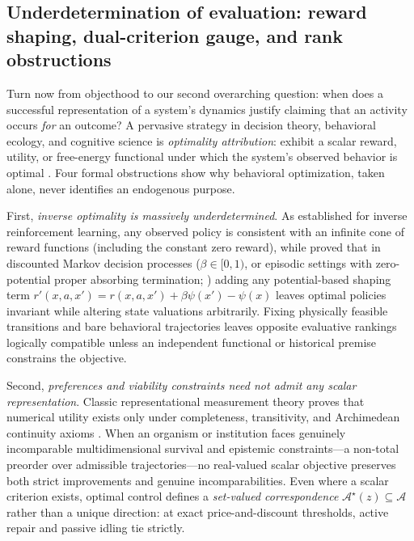 \documentclass[11pt,a4paper]{article}
\begin{document}
\subsection{Underdetermination of evaluation: reward shaping,
dual-criterion gauge, and rank
obstructions}\label{underdetermination-of-evaluation-reward-shaping-dual-criterion-gauge-and-rank-obstructions}

Turn now from objecthood to our second overarching question: when does a
successful representation of a system's dynamics justify claiming that
an activity occurs \emph{for} an outcome? A pervasive strategy in
decision theory, behavioral ecology, and cognitive science is
\emph{optimality attribution}: exhibit a scalar reward, utility, or
free-energy functional under which the system's observed behavior is
optimal \citep{puterman1994, friston2010}. Four formal obstructions show
why behavioral optimization, taken alone, never identifies an endogenous
purpose.

First, \emph{inverse optimality is massively underdetermined}. As
\citet[3.1]{ngRussell2000} established for inverse reinforcement
learning, any observed policy is consistent with an infinite cone of
reward functions (including the constant zero reward), while
\citet{ngHaradaRussell1999} proved that in discounted Markov decision
processes (\(\beta \in [0, 1)\), or episodic settings with
zero-potential proper absorbing termination; \citet{blackwell1965})
adding any potential-based shaping term
\(r'(x,a,x') = r(x,a,x') + \beta \psi(x') - \psi(x)\) leaves optimal
policies invariant while altering state valuations arbitrarily. Fixing
physically feasible transitions and bare behavioral trajectories leaves
opposite evaluative rankings logically compatible unless an independent
functional or historical premise constrains the objective.

Second, \emph{preferences and viability constraints need not admit any
scalar representation}. Classic representational measurement theory
proves that numerical utility exists only under completeness,
transitivity, and Archimedean continuity axioms \citep{krantz1971}. When
an organism or institution faces genuinely incomparable multidimensional
survival and epistemic constraints---a non-total preorder over
admissible trajectories---no real-valued scalar objective preserves both
strict improvements and genuine incomparabilities. Even where a scalar
criterion exists, optimal control defines a \emph{set-valued
correspondence} \(\mathcal{A}^\star(z) \subseteq \mathcal{A}\) rather
than a unique direction: at exact price-and-discount thresholds, active
repair and passive idling tie strictly.
\end{document}
